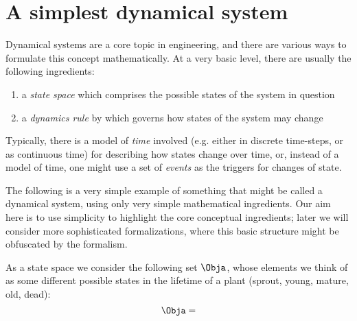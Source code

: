 
\section{A simplest dynamical system}
\label{sec:simplest-dyn-system}


Dynamical systems are a core topic in engineering, and there are various ways to formulate this concept mathematically. At a very basic level, there are usually the following ingredients: 
\begin{enumerate}
\item a \emph{state space} which comprises the possible states of the system in question
\item a \emph{dynamics rule} by which governs how states of the system may change
\end{enumerate}
Typically, there is a model of \emph{time} involved (e.g. either in discrete time-steps, or as continuous time) for describing how states change over time, or, instead of a model of time, one might use a set of \emph{events} as the triggers for changes of state. 

The following is a very simple example of something that might be called a dynamical system, using only very simple mathematical ingredients. Our aim here is to use simplicity to highlight the core conceptual ingredients; later we will consider more sophisticated formalizations, where this basic structure might be obfuscated by the formalism.

As a state space we consider the following set $\Obja$, whose elements we think of as some different possible states in the lifetime of a plant (sprout, young, mature, old, dead): 
\begin{equation}
\Obja =
\end{equation}
